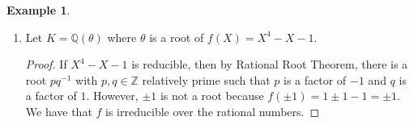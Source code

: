 \documentclass[a4paper]{book}
\theoremstyle{definition}
\newtheorem{example}{Example}[definition]
\begin{document}
\begin{example}
\begin{enumerate}
\begin{proof}
            Let \(\alpha = a + \theta b + \theta^2 c\) be an element in \(K\) and define a linear operator \(\Phi_\alpha\) by
            \begin{align*}
                1 + 0 \cdot \theta + 0 \cdot \theta^2 \mapsto \alpha &= a + \theta b + \theta^2 c \\
                0 + 1 \cdot \theta + 0 \cdot \theta^2 \mapsto \theta \alpha &= \theta^3c + \theta a + \theta^2 b \\
                &= (\theta + 1)c + \theta a + \theta^2 b \\
                &= c + \theta (a + c) + \theta^2 b \\
                0 + 0 \cdot \theta + 1 \cdot \theta^2 \mapsto \theta^2\alpha &= \theta^3 b + \theta^4 c + \theta^2 a \\
                &= (\theta + 1)b + (\theta^2 + \theta)c + \theta^2 a\\
                &= b + \theta b + \theta^2 c + \theta c + \theta^2 a \\
                &= b + \theta (b + c) + \theta^2 (a + c) 
            \end{align*}
            which we represent with a \(3 \times 3\) matrix
            \begin{align*}
                A_\Phi = \begin{pmatrix}
                    a & c & b \\
                    b & a + c & b + c \\
                    c & b & a + c
                \end{pmatrix}
            \end{align*}
            so we have \(\mathrm{Tr}_K(\alpha) = 3a + 2c\), \(\mathrm{N}_K(\alpha) = a^3 + b^3 + 2 a^2 c - b c^2 + c^3 + a (-b^2 - 3 b c + c^2)\), and \(\chi_\alpha(X) = \)
        \end{proof}
        \item Let \(K = \mathbb{Q}(\theta)\) where \(\theta\) is a root of \(f(X) = X^4 - X - 1\).
        \begin{proof}
            If \(X^4 - X - 1\) is reducible, then by Rational Root Theorem, there is a root \(pq^{-1}\) with \(p, q \in \mathbb{Z}\) relatively prime such that \(p\) is a factor of \(-1\) and \(q\) is a factor of \(1\). However, \(\pm 1\) is not a root because \(f(\pm 1) = 1 \pm 1 - 1 = \pm 1\). We have that \(f\) is irreducible over the rational numbers.


\end{proof}
\end{enumerate}
\end{example}
\end{document}
